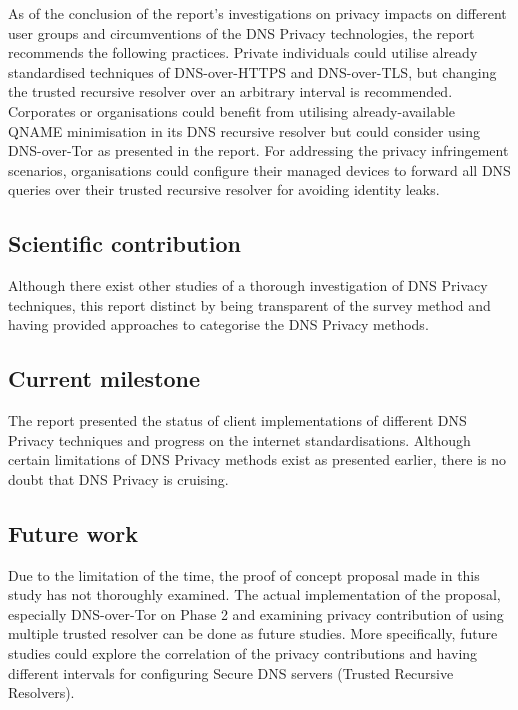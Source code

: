 \documentclass[a4paper,12pt]{article}
\begin{document}
As of the conclusion of the report's investigations on privacy impacts on different user groups and circumventions of the DNS Privacy technologies, the report recommends the following practices. Private individuals could utilise already standardised techniques of DNS-over-HTTPS and DNS-over-TLS, but changing the trusted recursive resolver over an arbitrary interval is recommended. Corporates or organisations could benefit from utilising already-available QNAME minimisation in its DNS recursive resolver but could consider using DNS-over-Tor as presented in the report. For addressing the privacy infringement scenarios, organisations could configure their managed devices to forward all DNS queries over their trusted recursive resolver for avoiding identity leaks.

\subsection{Scientific contribution}
Although there exist other studies of a thorough investigation of DNS Privacy techniques, this report distinct by being transparent of the survey method and having provided approaches to categorise the DNS Privacy methods.

\subsection{Current milestone}
The report presented the status of client implementations of different DNS Privacy techniques and progress on the internet standardisations.
Although certain limitations of DNS Privacy methods exist as presented earlier, there is no doubt that DNS Privacy is cruising.

\subsection{Future work}
Due to the limitation of the time, the proof of concept proposal made in this study has not thoroughly examined.
The actual implementation of the proposal, especially DNS-over-Tor on Phase 2 and examining privacy contribution of using multiple trusted resolver can be done as future studies.
More specifically, future studies could explore the correlation of the privacy contributions and having different intervals for configuring Secure DNS servers (Trusted Recursive Resolvers).
\newpage


%
\newpage
\end{document}
